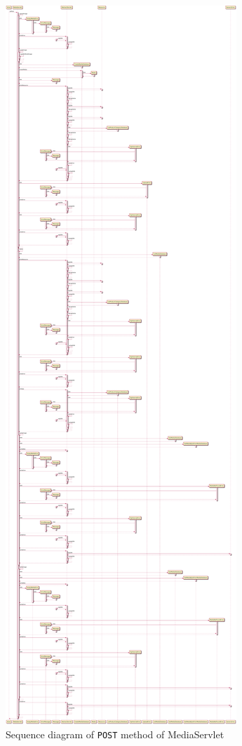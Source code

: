 \begin{figure}[H]
    \centering
    \includegraphics[width=\textwidth,height=0.9\textheight,keepaspectratio]{Schemas/MediaServlet_doPost.svg.pdf}
    \caption{Sequence diagram of \texttt{POST} method of MediaServlet}
    \label{fig:MediaServlet_doPost}
\end{figure}
